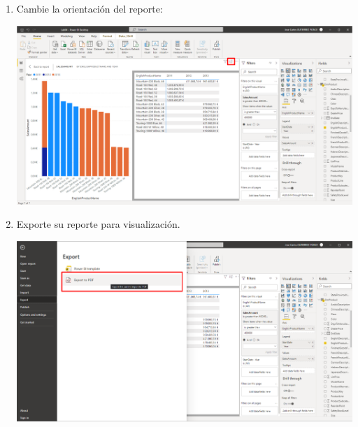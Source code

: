 \documentclass[12pt,letterpaper]{article}
\newcommand\tab[1][1cm]{\hspace*{#1}}
\begin{document}
\begin{enumerate}[\tab 1.]
\begin{itemize}
\begin{center}
            \end{center}
        \end{itemize}
        \item Cambie la orientación del reporte:
        \begin{center}
            \includegraphics[width=13cm]{./img/img17.png}
        \end{center}
        \item Exporte su reporte para visualización.
        \begin{center}
            \includegraphics[width=13cm]{./img/img18.png}
        \end{center}
    \end{enumerate}
    \newpage
\end{document}
